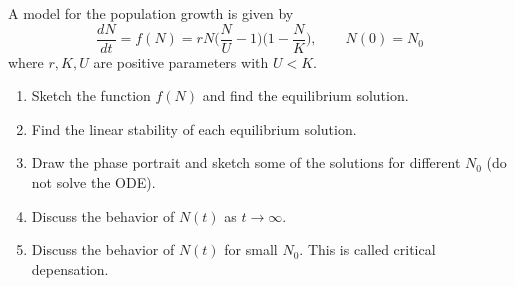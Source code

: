 \documentclass[12pt]{article}
\newenvironment{exercise}[2][Exercise]{\begin{trivlist}
\item[\hskip \labelsep {\bfseries #1}\hskip \labelsep {\bfseries #2.}]}{\end{trivlist}}
\begin{document}
\begin{exercise}{3}
A model for the population growth is given by 
$$\frac{dN}{dt} = f(N) = rN \bigg( \frac{N}{U} - 1 \bigg)\bigg( 1 - \frac{N}{K} \bigg), \qquad N(0) = N_0$$
where $r, K, U$ are positive parameters with $U < K$.

\begin{enumerate}
\item[a)] Sketch the function $f(N)$ and find the equilibrium solution.
\item[b)] Find the linear stability of each equilibrium solution.
\item[c)] Draw the phase portrait and sketch some of the solutions for different $N_0$ (do not solve the ODE).
\item[d)] Discuss the behavior of $N(t)$ as $t \rightarrow \infty$.
\item[e)] Discuss the behavior of $N(t)$ for small $N_0$. This is called critical depensation.
\end{enumerate}


\end{exercise}
\end{document}
